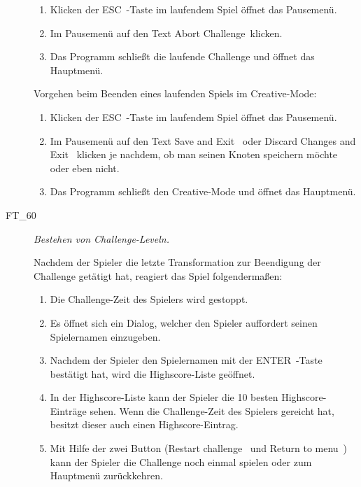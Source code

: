 \begin{description}
	\begin{enumerate} 
	
		\item Klicken der \glqq ESC\grqq~-Taste im laufendem Spiel öffnet das Pausemenü.
		\item Im Pausemenü auf den Text  \glqq Abort Challenge\grqq~klicken.
		\item Das Programm schließt die laufende Challenge und öffnet das Hauptmenü.
	\end{enumerate}
	
		Vorgehen beim Beenden eines laufenden Spiels im Creative-Mode:

	\begin{enumerate} 
	
		\item Klicken der \glqq ESC\grqq~-Taste im laufendem Spiel öffnet das Pausemenü.
		\item Im Pausemenü auf den Text \glqq Save and Exit\grqq~ oder \glqq Discard Changes and Exit\grqq~ klicken je nachdem, ob man seinen Knoten speichern möchte oder eben nicht.
		\item Das Programm schließt den Creative-Mode und öffnet das Hauptmenü.
		
		
	\end{enumerate}
	
	
	\item[FT\_60] \textit{Bestehen von Challenge-Leveln.} \hfill\\
	
	\label{FT:60}
	
	Nachdem der Spieler die letzte Transformation zur Beendigung der Challenge getätigt hat, reagiert das Spiel folgendermaßen:
	
	\begin{enumerate} 
	
	    \item Die Challenge-Zeit des Spielers wird gestoppt.
		\item Es öffnet sich ein Dialog, welcher den Spieler auffordert seinen Spielernamen einzugeben.
		\item Nachdem der Spieler den Spielernamen mit der \glqq ENTER\grqq~-Taste bestätigt hat, wird die Highscore-Liste geöffnet.
		\item In der Highscore-Liste kann der Spieler die 10 besten Highscore-Einträge sehen. Wenn die Challenge-Zeit des Spielers gereicht hat, besitzt dieser auch einen Highscore-Eintrag.
		\item Mit Hilfe der zwei Button (\glqq Restart challenge\grqq~ und \glqq Return to menu\grqq~) kann der Spieler die Challenge noch einmal spielen oder zum Hauptmenü zurückkehren.
		

\end{enumerate}
\end{description}
